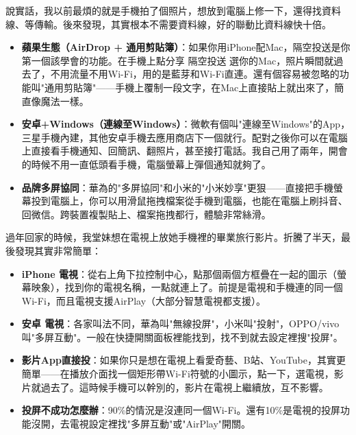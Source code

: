 


說實話，我以前最煩的就是手機拍了個照片，想放到電腦上修一下，還得找資料線、等傳輸。後來發現，其實根本不需要資料線，好的聯動比資料線快十倍。

\begin{itemize}
  \item \textbf{蘋果生態（AirDrop + 通用剪貼簿）}：如果你用iPhone配Mac，隔空投送是你第一個該學會的功能。在手機上點分享 隔空投送 選你的Mac，照片瞬間就過去了，不用流量不用Wi-Fi，用的是藍芽和Wi-Fi直連。還有個容易被忽略的功能叫"通用剪貼簿"——手機上覆制一段文字，在Mac上直接貼上就出來了，簡直像魔法一樣。
  \item \textbf{安卓+Windows（連線至Windows）}：微軟有個叫"連線至Windows"的App，三星手機內建，其他安卓手機去應用商店下一個就行。配對之後你可以在電腦上直接看手機通知、回簡訊、翻照片，甚至接打電話。我自己用了兩年，開會的時候不用一直低頭看手機，電腦螢幕上彈個通知就夠了。
  \item \textbf{品牌多屏協同}：華為的"多屏協同"和小米的"小米妙享"更狠——直接把手機螢幕投到電腦上，你可以用滑鼠拖拽檔案從手機到電腦，也能在電腦上刷抖音、回微信。跨裝置複製貼上、檔案拖拽都行，體驗非常絲滑。
\end{itemize}


過年回家的時候，我堂妹想在電視上放她手機裡的畢業旅行影片。折騰了半天，最後發現其實非常簡單：

\begin{itemize}
  \item \textbf{iPhone 電視}：從右上角下拉控制中心，點那個兩個方框疊在一起的圖示（螢幕映象），找到你的電視名稱，一點就連上了。前提是電視和手機連的同一個Wi-Fi，而且電視支援AirPlay（大部分智慧電視都支援）。
  \item \textbf{安卓 電視}：各家叫法不同，華為叫"無線投屏"，小米叫"投射"，OPPO/vivo叫"多屏互動"。一般在快捷開關面板裡能找到，找不到就去設定裡搜"投屏"。
  \item \textbf{影片App直接投}：如果你只是想在電視上看愛奇藝、B站、YouTube，其實更簡單——在播放介面找一個矩形帶Wi-Fi符號的小圖示，點一下，選電視，影片就過去了。這時候手機可以幹別的，影片在電視上繼續放，互不影響。
  \item \textbf{投屏不成功怎麼辦}：90\%的情況是沒連同一個Wi-Fi。還有10\%是電視的投屏功能沒開，去電視設定裡找"多屏互動"或"AirPlay"開關。
\end{itemize}

